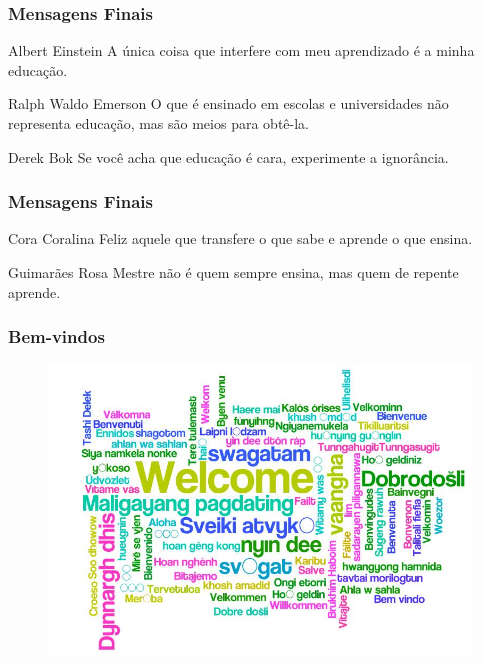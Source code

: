 \documentclass[aspectratio=169]{beamer}
\begin{document}
\begin{frame}\frametitle{Mensagens Finais}
	\begin{block}{Albert Einstein}
		A única coisa que interfere com meu aprendizado é a minha educação.
	\end{block}
	\begin{block}{Ralph Waldo Emerson}
		O que é ensinado em escolas e universidades não representa educação, mas são meios para obtê-la.
	\end{block}
	\begin{block}{Derek Bok}
		Se você acha que educação é cara, experimente a ignorância.
	\end{block}
\end{frame}

\begin{frame}\frametitle{Mensagens Finais}
	\begin{block}{Cora Coralina}
		Feliz aquele que transfere o que sabe e aprende o que ensina.
	\end{block}
	\begin{block}{Guimarães Rosa}
		Mestre não é quem sempre ensina, mas quem de repente aprende.
	\end{block}
\end{frame}

\begin{frame}\frametitle{Bem-vindos}
	\begin{figure}[h]
		\centering
		\includegraphics[height=0.7\paperheight]{pucrs-ec-poo-unidade_00-apresentacao_da_disciplina_e_revisao-laminas-welcome.jpg}
	\end{figure}
\end{frame}
\end{document}
